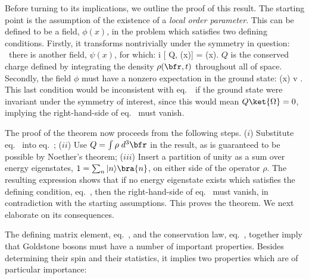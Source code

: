 \documentclass[12pt]{report}
\begin{document}
Before turning to its implications, we outline the proof of
this result. The starting point is the assumption of the
existence of a {\em local order parameter}. 
This can be defined to be a field, 
$\phi(x)$, in the problem which satisfies two defining
conditions. Firstly, it transforms nontrivially under the
symmetry in question: 
\ie\ there is another field, $\psi(x)$, for which:
%
\eq
\label{gbassone}
\delta \psi \equiv i [ Q, \psi(x)] = \phi(x). \eeq
%
$Q$ is the conserved charge defined by integrating the
density 
$\rho(\bfr,t)$ throughout all of space. Secondly, the field
$\phi$ must have a nonzero expectation in the ground state:
%
\eq
\label{gbasstwo}
\Avg{\phi} \equiv \bra{\Omega} \phi(x) \ket{\Omega}  \equiv
v .
\eeq
%
This last condition would be inconsistent with 
eq.~\  if the ground state were invariant
under the symmetry of interest, since this would mean $Q
\ket{\Omega} = 0$, implying the right-hand-side of
eq.~ must vanish.

The proof of the theorem now proceeds from the following
steps. ($i$) Substitute eq.~ into
eq.~; ($ii$) Use  $Q = \int \rho\; d^3\bfr$
in the result, as is guaranteed to be possible by Noether's
theorem; ($iii$) Insert a partition of unity as a sum over
energy eigenstates, $1 = \sum_n |
n \rangle \bra{n}$, on either side of the operator $\rho$.
The resulting expression shows that if no energy eigenstate exists
which satisfies the defining condition, eq.~,
then the right-hand-side of eq.~ must
vanish, in contradiction with the starting assumptions.
This proves the theorem. We next elaborate on its
consequences.

The defining matrix element, eq.~, and the
conservation law, eq.~, together imply
that Goldstone bosons must have a number of important
properties. Besides determining their spin and their
statistics, it implies two properties which are of
particular importance:
\end{document}
